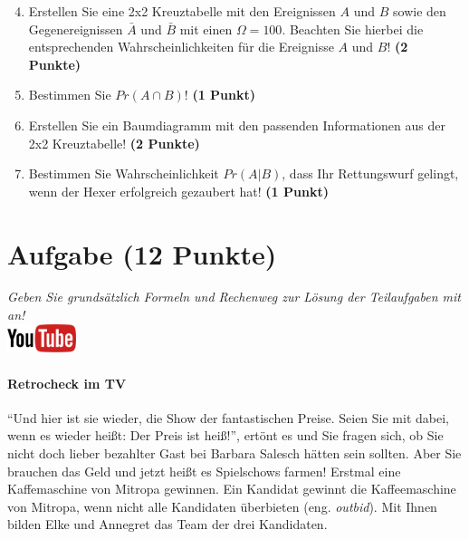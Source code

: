 \documentclass[a4paper, 10pt]{scrartcl}\usepackage[]{graphicx}\usepackage[]{xcolor}
\begin{document}
\begin{enumerate}
  \setcounter{enumi}{3}
\item Erstellen Sie eine 2x2 Kreuztabelle mit den Ereignissen $A$ und $B$
  sowie den Gegenereignissen $\bar{A}$ und $\bar{B}$ mit einen
  $\Omega = 100$. Beachten Sie hierbei die entsprechenden
  Wahrscheinlichkeiten f{\"u}r die Ereignisse $A$ und $B$! \textbf{(2 Punkte)}
\item Bestimmen Sie $Pr(A \cap B)$! \textbf{(1 Punkt)}
\item Erstellen Sie ein Baumdiagramm mit den passenden Informationen aus der 2x2
  Kreuztabelle! \textbf{(2 Punkte)}
\item Bestimmen Sie Wahrscheinlichkeit $Pr(A|B)$, dass Ihr Rettungswurf gelingt, wenn
  der Hexer erfolgreich gezaubert hat! \textbf{(1 Punkt)}
\end{enumerate}

  
\clearpage

\section{Aufgabe \hfill (12 Punkte)}

\textit{Geben Sie grunds{\"a}tzlich Formeln und Rechenweg zur L{\"o}sung der
  Teilaufgaben mit an!} \\[1Ex]

\hfill\href{https://youtu.be/9DQKaXdxT_g}{\includegraphics[width =
  2cm]{img/youtube}} %
\hspace{2Ex}

\paragraph{Retrocheck im TV}



"`Und hier ist sie wieder, die Show der fantastischen Preise. Seien Sie mit
dabei, wenn es wieder hei{\ss}t: Der Preis ist hei{\ss}!"', ert{\"o}nt es und Sie
fragen sich, ob Sie nicht doch lieber bezahlter Gast bei Barbara Salesch
h{\"a}tten sein sollten. Aber Sie brauchen das Geld und jetzt hei{\ss}t es
Spielschows farmen! Erstmal eine Kaffemaschine von Mitropa
gewinnen. Ein Kandidat gewinnt die Kaffeemaschine von Mitropa, wenn nicht alle
Kandidaten {\"u}berbieten (eng. \textit{outbid}). Mit Ihnen bilden
Elke und Annegret das Team der drei Kandidaten.
\end{document}
